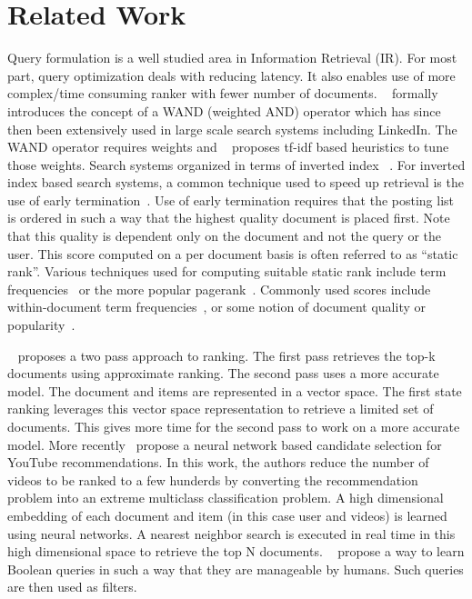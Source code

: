 \section{Related Work}
Query formulation is a well studied area in Information Retrieval (IR). For
most part, query optimization deals with reducing latency. It also enables use
of more complex/time consuming ranker with fewer number of documents. 
~\cite{broder2003efficient} formally introduces the concept of a WAND (weighted AND) operator which has since
then been extensively used in large scale search systems including LinkedIn.
The WAND operator requires weights and ~\cite{broder2003efficient} proposes
tf-idf based heuristics to tune those weights. Search systems organized in
terms of inverted index ~\cite{goel2009predictive}. For inverted index based
search systems, a common technique used to speed up retrieval is the use of
early termination~\cite{anh2001vector,yan2010efficient,zhang2010revisiting}.
Use of early termination requires that the posting list 
is ordered in such a way that the highest quality document is
placed first. Note that this quality is dependent only on the document and not
the query or the user. This score computed on a per document basis is often
referred to as ``static rank''. 
Various techniques used for computing suitable
static rank include term frequencies~\cite{persin1996filtered} or the more
popular pagerank~\cite{brin2007anatomy}.
Commonly used scores include within-document term frequencies~\cite{persin1996filtered},
or some notion of document quality or popularity~\cite{brin2007anatomy}.

~\cite{agarwal2012fast} proposes a two pass approach to ranking. The first pass
retrieves the top-k documents using approximate ranking. The second pass uses a
more accurate model. The document and items are represented in a vector space.
The first state ranking leverages this vector space representation to retrieve
a limited set of documents. This gives more time for the second pass to work on
a more accurate model. 
More recently~\cite{covington2016deep} propose a neural network based candidate
selection for YouTube recommendations. In this work, the authors reduce the
number of videos to be ranked to a few hunderds by converting the
recommendation problem into an extreme multiclass classification problem. A
high dimensional embedding of each document and item (in this case user and videos) 
is learned using neural networks. A nearest neighbor search is executed in real
time in this high dimensional space to retrieve the top N documents.
~\cite{aphi2004learning} propose a way to learn Boolean queries in
such a way that they are manageable by humans. Such queries are then used as
filters. 

